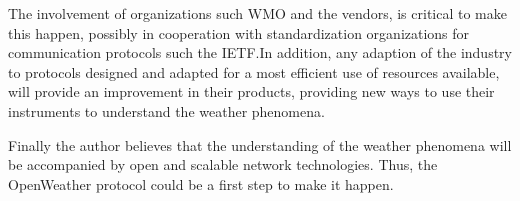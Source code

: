 The involvement of organizations such \gls{WMO} and the vendors,  is critical to make this happen, possibly in cooperation with standardization organizations for communication protocols such the \gls{IETF}.In addition, any adaption of the industry to protocols designed and adapted for a most efficient use of resources available, will provide an improvement in their products, providing new ways to use their instruments to understand the weather phenomena.

Finally the author believes that the understanding of the weather phenomena will be accompanied by open and scalable network technologies. Thus, the OpenWeather protocol could be a first step to make it happen.

\pagebreak
